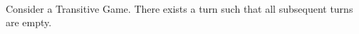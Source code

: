 \begin{theorem} \ \\
  \label{convergence}
  Consider a Transitive Game. There exists a turn such that all subsequent turns are empty.
\end{theorem}
